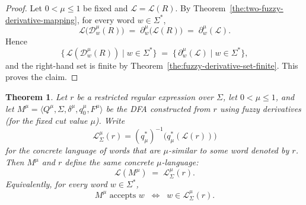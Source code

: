 \documentclass{article}
\def\cut{\mu}
\newtheorem{theorem}{Theorem}[section]
\begin{document}
\begin{proof}
Let $0 < \cut \le 1$ be fixed and $\mathcal{L} = \mathcal{L}(R)$.
By Theorem~\ref{the:two-fuzzy-derivative-mapping}, for every word $w \in \Sigma^*$,
\[
  \mathcal{L}\bigl(\mathcal{D}^\cut_w(R)\bigr)
  \;=\;
  \partial^\cut_w\bigl(\mathcal{L}(R)\bigr)
  \;=\;
  \partial^\cut_w(\mathcal{L}).
\]
Hence
\[
  \bigl\{\, \mathcal{L}(\mathcal{D}^\cut_{w}(R)) \mid w \in \Sigma^* \bigr\}
  \;=\;
  \bigl\{\, \partial^\cut_w(\mathcal{L}) \mid w \in \Sigma^* \bigr\},
\]
and the right-hand set is finite by
Theorem~\ref{the:fuzzy-derivative-set-finite}. This proves the claim.
\end{proof}



\begin{theorem}\label{the:fuzzy-dfa-correctness}
Let $r$ be a restricted regular expression over $\Sigma$, let $0 < \cut \le 1$, and let
$M^\cut = \langle Q^\cut, \Sigma, \delta^\cut, q_0^\cut, F^\cut \rangle$
be the DFA constructed from $r$ using fuzzy derivatives (for the fixed cut
value $\cut$).
Write
\[
  \mathcal L^\cut_\Sigma(r)
  =
  (q_\cut^*)^{-1}\bigl(q_\cut^*(\mathcal L(r))\bigr)
\]
for the concrete language of words that are $\cut$-similar to some word denoted
by $r$. Then $M^\cut$ and $r$ define the same concrete $\cut$-language:
\[
  \mathcal{L}(M^\cut) \;=\; \mathcal{L}^\cut_\Sigma(r).
\]
Equivalently, for every word $w \in \Sigma^*$,
\[
  M^\cut \text{ accepts } w
  \;\;\Longleftrightarrow\;\;
  w \in \mathcal{L}^\cut_\Sigma(r).
\]
\end{theorem}
\end{document}
